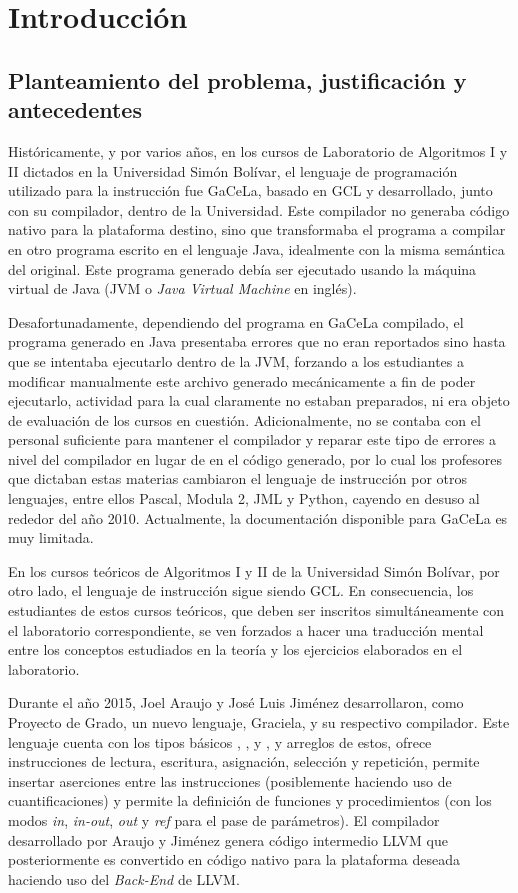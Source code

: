 \chapter*{Introducción}
\label{intro}

\section*{Planteamiento del problema, justificación y antecedentes}

Históricamente, y por varios años, en los cursos de Laboratorio de Algoritmos I
y II dictados en la Universidad Simón Bolívar, el lenguaje de programación
utilizado para la instrucción fue GaCeLa, basado en GCL y desarrollado, junto
con su compilador, dentro de la Universidad. Este compilador no generaba código
nativo para la plataforma destino, sino que transformaba el programa a compilar
en otro programa escrito en el lenguaje Java, idealmente con la misma semántica
del original. Este programa generado debía ser ejecutado usando la máquina
virtual de Java (JVM o \textit{Java Virtual Machine} en inglés).

Desafortunadamente, dependiendo del programa en GaCeLa compilado, el programa
generado en Java presentaba errores que no eran reportados sino hasta que se
intentaba ejecutarlo dentro de la JVM, forzando a los estudiantes a modificar
manualmente este archivo generado mecánicamente a fin de poder ejecutarlo,
actividad para la cual claramente no estaban preparados, ni era objeto de
evaluación de los cursos en cuestión. Adicionalmente, no se contaba con el
personal suficiente para mantener el compilador y reparar este tipo de errores a
nivel del compilador en lugar de en el código generado, por lo cual los
profesores que dictaban estas materias cambiaron el lenguaje de instrucción por
otros lenguajes, entre ellos Pascal, Modula 2, JML y Python, cayendo en desuso
al rededor del año 2010. Actualmente, la documentación disponible para GaCeLa es
muy limitada.

En los cursos teóricos de Algoritmos I y II de la Universidad Simón Bolívar, por
otro lado, el lenguaje de instrucción sigue siendo GCL. En consecuencia, los
estudiantes de estos cursos teóricos, que deben ser inscritos simultáneamente
con el laboratorio correspondiente, se ven forzados a hacer una traducción
mental entre los conceptos estudiados en la teoría y los ejercicios elaborados
en el laboratorio.

Durante el año 2015, Joel Araujo y José Luis Jiménez desarrollaron, como
Proyecto de Grado, un nuevo lenguaje, Graciela, y su respectivo compilador. Este
lenguaje cuenta con los tipos básicos , ,  y
, y arreglos de estos, ofrece instrucciones de lectura,
escritura, asignación, selección y repetición, permite insertar aserciones entre
las instrucciones (posiblemente haciendo uso de cuantificaciones) y permite la
definición de funciones y procedimientos (con los modos \textit{in},
\textit{in-out}, \textit{out} y \textit{ref} para el pase de parámetros). El
compilador desarrollado por Araujo y Jiménez genera código intermedio LLVM que
posteriormente es convertido en código nativo para la plataforma deseada
haciendo uso del \textit{Back-End} de LLVM.

